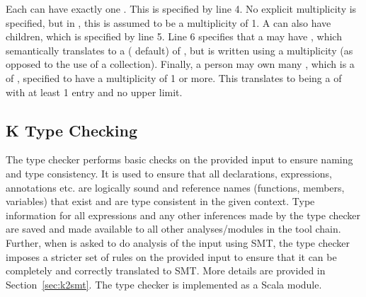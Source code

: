 Each  can have exactly one . This is
specified by line 4. No explicit multiplicity is specified, but in
\Klang{}, this is assumed to be a multiplicity of 1. A 
can also have children, which is specified by line 5. Line 6 specifies
that a  may have , which semantically
translates to a  (\Klang{} default) of , but is
written using a multiplicity (as opposed to the use of a
collection). Finally, a person may own many , which is a
 of , specified to have a multiplicity of
1 or more. This translates to  being a  of
 with at least 1 entry and no upper limit. 

\subsection{K Type Checking}

The \Klang{} type checker performs basic checks on the provided input
to ensure naming and type consistency. It is used to ensure that all
declarations, expressions, annotations etc. are logically sound and
reference names (functions, members, variables) that exist and are
type consistent in the given context. Type information for all
expressions and any other inferences made by the type checker are
saved and made available to all other analyses/modules in the \Klang{}
tool chain. Further, when \Klang{} is asked to do analysis of the
input using SMT, the type checker imposes a stricter set of rules on
the provided input to ensure that it can be completely and correctly
translated to SMT. More details are provided in
Section~\ref{sec:k2smt}. The type checker is implemented as a Scala
module.
